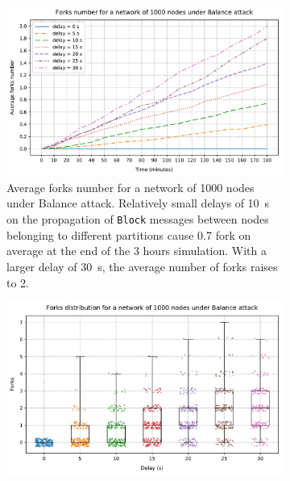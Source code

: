 \begin{figure}[ht]
	\begin{subfigure}{\textwidth}
		\centering
		\includegraphics[width=\myplotswitdth \columnwidth]{plots/forks_attack_delay_1000_linechart}
		\vspace*{0.25cm}
		\caption{
			Average forks number for a network of \num{1000} nodes under Balance attack.
			Relatively small delays of \SI{10}{\second} on the propagation of \texttt{Block} messages between nodes belonging to different partitions cause \num{0.7} fork on average at the end of the \num{3} hours simulation.
			With a larger delay of \SI{30}{\second}, the average number of forks raises to \num{2}.
		}
		\vspace*{0.75cm}
	\end{subfigure}
	\begin{subfigure}{\textwidth}
		\centering
		\vspace*{0.25cm}
		\includegraphics[width=\myplotswitdth \columnwidth]{plots/forks_attack_delay_1000_boxplot}

\end{subfigure}
\end{figure}
